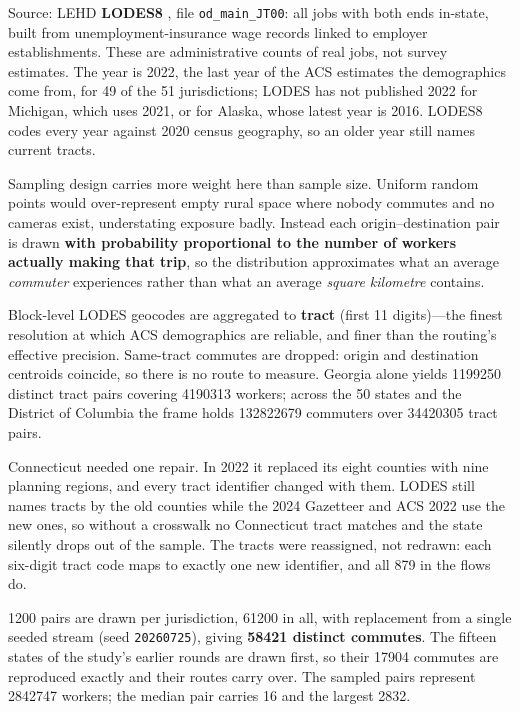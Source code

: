 \documentclass[11pt,twoside]{article}
\begin{document}
Source: LEHD \textbf{LODES8} \citep{lodes8}, file \texttt{od\_main\_JT00}: all jobs with both
ends in-state, built from unemployment-insurance wage records linked to employer
establishments. These are
administrative counts of real jobs, not survey estimates. The year is 2022, the last year of
the ACS estimates the demographics come from, for 49 of the 51 jurisdictions; LODES has not published 2022 for Michigan, which uses 2021, or for Alaska,
whose latest year is 2016. LODES8 codes every year against 2020 census geography, so an
older year still names current tracts.

Sampling design carries more weight here than sample size. Uniform random points would
over-represent empty rural space where nobody commutes and no cameras exist, understating
exposure badly. Instead each origin--destination pair is drawn \textbf{with probability
proportional to the number of workers actually making that trip}, so the distribution
approximates what an average \emph{commuter} experiences rather than what an average
\emph{square kilometre} contains.

Block-level LODES geocodes are aggregated to \textbf{tract} (first 11 digits)---the finest
resolution at which ACS demographics are reliable, and finer than the routing's effective
precision. Same-tract commutes are dropped: origin and destination centroids coincide, so
there is no route to measure. Georgia alone yields \num{1199250} distinct tract pairs
covering \num{4190313} workers; across the 50 states and the District of Columbia the frame
holds \num{132822679} commuters over \num{34420305} tract pairs.

Connecticut needed one repair. In 2022 it replaced its eight counties with nine planning
regions, and every tract identifier changed with them. LODES still names tracts by the old
counties while the 2024 Gazetteer and ACS 2022 use the new ones, so without a crosswalk no
Connecticut tract matches and the state silently drops out of the sample. The tracts were
reassigned, not redrawn: each six-digit tract code maps to exactly one new identifier, and
all 879 in the flows do.

\num{1200} pairs are drawn per jurisdiction, \num{61200} in all, with replacement from a
single seeded stream (seed \texttt{20260725}), giving \textbf{\num{58421} distinct commutes}.
The fifteen states of the study's earlier rounds are drawn first, so their \num{17904}
commutes are reproduced exactly and their routes carry over. The sampled pairs represent
\num{2842747} workers; the median pair carries 16 and the largest \num{2832}.
\end{document}
